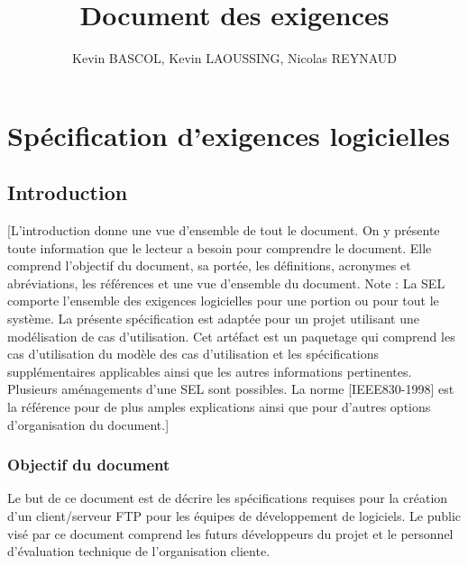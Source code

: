 \documentclass[10pt,a4paper]{report}
\author{Kevin BASCOL, Kevin LAOUSSING, Nicolas REYNAUD}
\title{Document des exigences}
\begin{document}
\maketitle
\newpage
\setcounter{secnumdepth}{4}
\setcounter{tocdepth}{4}
\renewcommand{\contentsname}{Sommaire}
\tableofcontents
\newpage

\chapter*{Spécification d'exigences logicielles}

\section{Introduction}
[L’introduction donne une vue d’ensemble de tout le document. On y présente toute information que le lecteur a besoin pour  comprendre le document. Elle comprend l’objectif du document, sa portée, les définitions, acronymes et abréviations, les références et une vue d’ensemble du document.
Note : La SEL comporte l’ensemble des exigences logicielles pour une portion ou pour tout le système. La présente spécification est adaptée pour  un projet utilisant une modélisation de cas d’utilisation. Cet artéfact est un paquetage qui comprend les cas d’utilisation du modèle des cas d’utilisation et les spécifications supplémentaires applicables ainsi que les autres informations pertinentes.
Plusieurs aménagements d’une SEL sont possibles. La norme [IEEE830-1998] est la référence pour de plus amples explications ainsi que pour d’autres options d’organisation du document.]

\subsection{Objectif du document}
Le but de ce document est de décrire les spécifications requises pour la création d'un  client/serveur FTP pour les équipes de développement de logiciels.
Le public visé par ce document comprend les futurs développeurs du projet et le personnel d'évaluation technique de l'organisation cliente.
\end{document}
